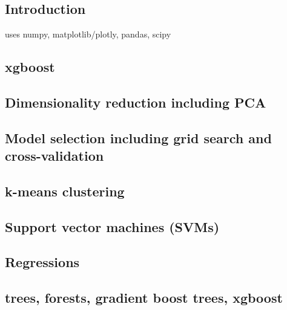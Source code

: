 
\subsection{Introduction}

uses numpy, matplotlib/plotly, pandas, scipy

\subsection{xgboost}

\subsection{Dimensionality reduction including PCA}

\subsection{Model selection including grid search and cross-validation}

\subsection{k-means clustering}

\subsection{Support vector machines (SVMs)}

\subsection{Regressions}

\subsection{trees, forests, gradient boost trees, xgboost}
